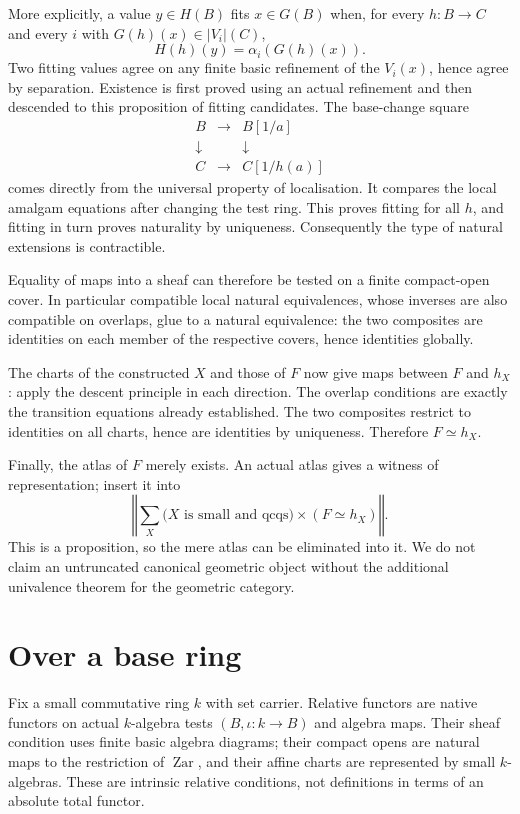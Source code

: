 \documentclass[11pt]{amsart}
\theoremstyle{definition}\newtheorem{definition}[theorem]{Definition}
\theoremstyle{remark}\newtheorem{remark}[theorem]{Remark}
\newcommand{\tr}[1]{\left\Vert #1\right\Vert}
\begin{document}
More explicitly, a value $y\in H(B)$ fits $x\in G(B)$ when, for every
$h:B\to C$ and every $i$ with $G(h)(x)\in|V_i|(C)$,
\[
 H(h)(y)=\alpha_i(G(h)(x)).
\]
Two fitting values agree on any finite basic refinement of the $V_i(x)$,
hence agree by separation. Existence is first proved using an actual
refinement and then descended to this proposition of fitting candidates.
The base-change square
\[
\begin{array}{ccc}
 B&\longrightarrow&B[1/a]\\
 \downarrow&&\downarrow\\
 C&\longrightarrow&C[1/h(a)]
\end{array}
\]
comes directly from the universal property of localisation. It compares
the local amalgam equations after changing the test ring. This proves
fitting for all $h$, and fitting in turn proves naturality by uniqueness.
Consequently the type of natural extensions is contractible.

Equality of maps into a sheaf can therefore be tested on a finite
compact-open cover. In particular compatible local natural equivalences,
whose inverses are also compatible on overlaps, glue to a natural
equivalence: the two composites are identities on each member of the
respective covers, hence identities globally.

The charts of the constructed $X$ and those of $F$ now give maps between
$F$ and $h_X$: apply the descent principle in each direction. The overlap
conditions are exactly the transition equations already established.
The two composites restrict to identities on all charts, hence are
identities by uniqueness. Therefore $F\simeq h_X$.

Finally, the atlas of $F$ merely exists. An actual atlas gives a witness
of representation; insert it into
\[
 \tr{\sum_X\bigl(\text{$X$ is small and qcqs}\bigr)\times(F\simeq h_X)}.
\]
This is a proposition, so the mere atlas can be eliminated into it.
We do not claim an untruncated canonical geometric object without the
additional univalence theorem for the geometric category.

\section{Over a base ring}
Fix a small commutative ring $k$ with set carrier. Relative functors are
native functors on actual $k$-algebra tests $(B,\iota:k\to B)$ and
algebra maps. Their sheaf condition uses finite basic algebra diagrams;
their compact opens are natural maps to the restriction of
$\operatorname{Zar}$, and their affine charts are represented by small
$k$-algebras. These are intrinsic relative conditions, not definitions
in terms of an absolute total functor.
\end{document}
